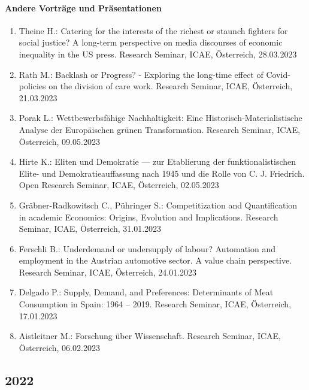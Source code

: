\paragraph{Andere Vorträge und Präsentationen}
\begin{enumerate}
	\item Theine H.: Catering for the interests of the richest or staunch fighters for social justice? A long-term perspective on media discourses of economic inequality in the US press. Research Seminar, ICAE, Österreich, 28.03.2023
	\item Rath M.: Backlash or Progress? - Exploring the long-time effect of Covid-policies on the division of care work. Research Seminar, ICAE, Österreich, 21.03.2023
	\item Porak L.: Wettbewerbsfähige Nachhaltigkeit: Eine Historisch-Materialistische Analyse der Europäischen grünen Transformation. Research Seminar, ICAE, Österreich, 09.05.2023
	\item Hirte K.: Eliten und Demokratie — zur Etablierung der funktionalistischen Elite- und Demokratieauffassung nach 1945 und die Rolle von C. J. Friedrich. Open Research Seminar, ICAE, Österreich, 02.05.2023
	\item Gräbner-Radkowitsch C., Pühringer S.: Competitization and Quantification in academic Economics: Origins, Evolution and Implications. Research Seminar, ICAE, Österreich, 31.01.2023
	\item Ferschli B.: Underdemand or undersupply of labour? Automation and employment in the Austrian automotive sector. A value chain perspective. Research Seminar, ICAE, Österreich, 24.01.2023
	\item Delgado P.: Supply, Demand, and Preferences: Determinants of Meat Consumption in Spain: 1964 – 2019. Research Seminar, ICAE, Österreich, 17.01.2023
	\item Aistleitner M.: Forschung über Wissenschaft. Research Seminar, ICAE, Österreich, 06.02.2023
\end{enumerate}
\subsection*{2022}
